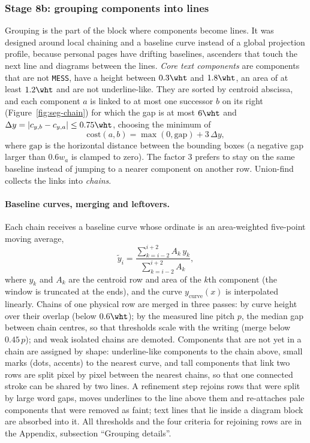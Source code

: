 \subsubsection{Stage 8b: grouping components into lines}

Grouping is the part of the block where components become lines.
It was designed around local chaining and a baseline curve instead of a global projection profile, because personal pages have drifting baselines, ascenders that touch the next line and diagrams between the lines.
\emph{Core text components} are components that are not \texttt{MESS}, have a height between $0.3\wht$ and $1.8\wht$, an area of at least $1.2\wht$ and are not underline-like.
They are sorted by centroid abscissa, and each component $a$ is linked to at most one successor $b$ on its right (Figure~\ref{fig:seg-chain}) for which the gap is at most $6\wht$ and $\Delta y=|c_{y,b}-c_{y,a}|\le0.75\wht$, choosing the minimum of
\begin{equation}
\mathrm{cost}(a,b)=\max(0,\mathrm{gap})+3\,\Delta y,
\label{eq:seg-cost}
\end{equation}
where $\mathrm{gap}$ is the horizontal distance between the bounding boxes (a negative gap larger than $0.6w_a$ is clamped to zero).
The factor 3 prefers to stay on the same baseline instead of jumping to a nearer component on another row.
Union-find collects the links into \emph{chains}.


\paragraph{Baseline curves, merging and leftovers.}
Each chain receives a baseline curve whose ordinate is an area-weighted five-point moving average,
\begin{equation}
\tilde y_i=\frac{\sum_{k=i-2}^{i+2}A_k\,y_k}{\sum_{k=i-2}^{i+2}A_k},
\label{eq:seg-curve}
\end{equation}
where $y_k$ and $A_k$ are the centroid row and area of the $k$th component (the window is truncated at the ends), and the curve $y_{\mathrm{curve}}(x)$ is interpolated linearly.
Chains of one physical row are merged in three passes: by curve height over their overlap (below $0.6\wht$); by the measured line pitch $p$, the median gap between chain centres, so that thresholds scale with the writing (merge below $0.45\,p$); and weak isolated chains are demoted.
Components that are not yet in a chain are assigned by shape: underline-like components to the chain above, small marks (dots, accents) to the nearest curve, and tall components that link two rows are split pixel by pixel between the nearest chains, so that one connected stroke can be shared by two lines.
A refinement step rejoins rows that were split by large word gaps, moves underlines to the line above them and re-attaches pale components that were removed as faint; text lines that lie inside a diagram block are absorbed into it.
All thresholds and the four criteria for rejoining rows are in the Appendix, subsection ``Grouping details''.

